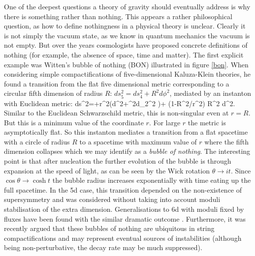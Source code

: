 One of the deepest questions a theory of gravity should eventually address is why there is something rather than nothing. This appears a rather philosophical question, as how to define nothingness in a physical theory is unclear. Clearly it is not simply the vacuum state, as we know in 
quantum mechanics the vacuum is not empty. But over the years cosmologists have proposed concrete definitions of nothing (for example, the absence of space, time and matter). The first explicit example was Witten's bubble of nothing (BON) \cite{Witten:1981gj} illustrated in figure \ref{bon}. When considering simple compactifications of five-dimensional Kaluza-Klein theories, he found a transition from the flat five dimensional metric corresponding to a circular fifth dimension of radius $R$: $ds_5^2= ds_4^2+R^2 d\phi^2$, mediated by an instanton with Euclidean metric:
\be
ds^2=+r^2\left(d\theta^2+\cos^2\theta d\Omega_2^2 \right)+ \left(1-R^2/r^2\right) R^2 d\phi^2.
\ee
Similar to the Euclidean Schwarzschild metric, this is non-singular even at $r=R$. But this is a minimum value of the coordinate $r$. For large $r$ the metric is asymptotically flat. So this instanton mediates a transition from a flat spacetime with a circle of radius $R$ to a spacetime with maximum value of $r$ where the fifth dimension collapses which we may identify as a {\it bubble of nothing}. The interesting point is that after nucleation the further evolution of the bubble is through expansion at the speed of light, as can be seen by the Wick rotation $\theta\to it$. Since
$\cos\theta \to \cosh t$ the bubble radius increases exponentially with time eating up the full spacetime. In the 5d case, 
this transition depended on the non-existence of supersymmetry and was considered without taking into account moduli stabilisation of the extra dimension. Generalisations to 6d with moduli fixed by fluxes have been found with the similar dramatic outcome \cite{Blanco-Pillado:2010xww,Brown:2011gt}. Furthermore, it was recently argued that these bubbles of nothing are ubiquitous in string compactifications \cite{GarciaEtxebarria:2020xsr} and may represent eventual sources of instabilities (although being non-perturbative, the decay rate may be much suppressed).
